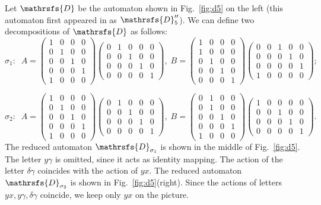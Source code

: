 \documentclass[11pt]{llncs}
\newcommand{\g}{\gamma}
\newcommand{\dl}{\delta}
\begin{document}
\begin{example}
\label{ex} Let $\mathrsfs{D}$ be the automaton shown in Fig.~\ref{fig:d5} on the left (this automaton first appeared in \cite{AGV} as
$\mathrsfs{D}''_5$). We can define two decompositions of $\mathrsfs{D}$ as follows:
$$
\sigma_1:\;\;
A =
\left(
\begin{smallmatrix}
1&0&0&0\\
0&1&0&0\\
0&0&1&0\\
0&0&0&1\\
1&0&0&0
\end{smallmatrix}
\right)
\left(
\begin{smallmatrix}
0&1&0&0&0\\
0&0&1&0&0\\
0&0&0&1&0\\
0&0&0&0&1
\end{smallmatrix}
\right),\;
B =
\left(
\begin{smallmatrix}
1&0&0&0\\
1&0&0&0\\
0&1&0&0\\
0&0&1&0\\
0&0&0&1
\end{smallmatrix}
\right)
\left(
\begin{smallmatrix}
0&0&1&0&0\\
0&0&0&1&0\\
0&0&0&0&1\\
1&0&0&0&0
\end{smallmatrix}
\right);
$$


$$
\sigma_2:\;\;
A =
\left(
\begin{smallmatrix}
1&0&0&0\\
0&1&0&0\\
0&0&1&0\\
0&0&0&1\\
1&0&0&0
\end{smallmatrix}
\right)
\left(
\begin{smallmatrix}
0&1&0&0&0\\
0&0&1&0&0\\
0&0&0&1&0\\
0&0&0&0&1
\end{smallmatrix}
\right),\;
B =
\left(
\begin{smallmatrix}
0&1&0&0\\
0&1&0&0\\
0&0&1&0\\
0&0&0&1\\
1&0&0&0
\end{smallmatrix}
\right)
\left(
\begin{smallmatrix}
1&0&0&0&0\\
0&0&1&0&0\\
0&0&0&1&0\\
0&0&0&0&1
\end{smallmatrix}
\right).
$$
The reduced automaton $\mathrsfs{D}_{\sigma_1}$ is shown in the middle of Fig.~\ref{fig:d5}. The letter $y \g$ is omitted, since it acts as
identity mapping. The action of the letter $\dl \g$ coincides with the action of $yx$. The reduced automaton $\mathrsfs{D}_{\sigma_2}$ is
shown in Fig.~\ref{fig:d5}(right). Since the actions of letters $yx, y\g, \dl \g$ coincide, we keep only $yx$ on the picture.


\end{example}
\end{document}

